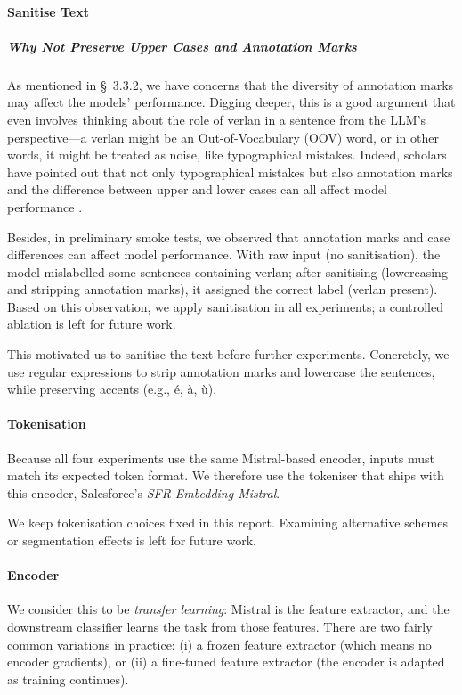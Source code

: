 \documentclass[12pt]{article}
\begin{document}
\paragraph{Sanitise Text}
\subparagraph{Why Not Preserve Upper Cases and Annotation Marks}
As mentioned in §~3.3.2, we have concerns that the diversity of annotation marks may affect the models' performance. Digging deeper, this is a good argument that even involves thinking about the role of verlan in a sentence from the LLM's perspective\;---\;a verlan might be an Out-of-Vocabulary (OOV) word, or in other words, it might be treated as noise, like typographical mistakes. Indeed, scholars have pointed out that not only typographical mistakes but also annotation marks and the difference between upper and lower cases can all affect model performance \cite{alsharou2021noise}. 

Besides, in preliminary smoke tests, we observed that annotation marks and case differences can affect model performance. With raw input (no sanitisation), the model mislabelled some sentences containing verlan; after sanitising (lowercasing and stripping annotation marks), it assigned the correct label (verlan present). Based on this observation, we apply sanitisation in all experiments; a controlled ablation is left for future work.

This motivated us to sanitise the text before further experiments. Concretely, we use regular expressions to strip annotation marks and lowercase the sentences, while preserving accents (e.g., é, à, ù).

\paragraph{Tokenisation}
Because all four experiments use the same Mistral-based encoder, inputs must match its expected token format. We therefore use the tokeniser that ships with this encoder, Salesforce's \textit{SFR-Embedding-Mistral}.

We keep tokenisation choices fixed in this report. Examining alternative schemes or segmentation effects is left for future work.

\paragraph{Encoder}
We consider this to be \textit{transfer learning}: Mistral is the feature extractor, and the downstream classifier learns the task from those features. There are two fairly common variations in practice: (i) a frozen feature extractor (which means no encoder gradients), or (ii) a fine-tuned feature extractor (the encoder is adapted as training continues).
\end{document}
